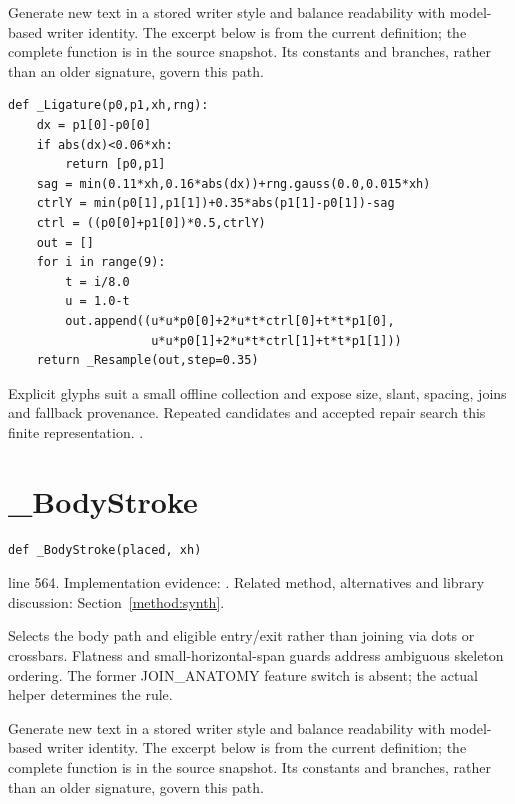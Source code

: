Generate new text in a stored writer style and balance readability with model-based writer identity. The excerpt below is from the current definition; the complete function is in the source snapshot. Its constants and branches, rather than an older signature, govern this path.


\begin{lstlisting}[style=plain]
def _Ligature(p0,p1,xh,rng):
    dx = p1[0]-p0[0]
    if abs(dx)<0.06*xh:
        return [p0,p1]
    sag = min(0.11*xh,0.16*abs(dx))+rng.gauss(0.0,0.015*xh)
    ctrlY = min(p0[1],p1[1])+0.35*abs(p1[1]-p0[1])-sag
    ctrl = ((p0[0]+p1[0])*0.5,ctrlY)
    out = []
    for i in range(9):
        t = i/8.0
        u = 1.0-t
        out.append((u*u*p0[0]+2*u*t*ctrl[0]+t*t*p1[0],
                    u*u*p0[1]+2*u*t*ctrl[1]+t*t*p1[1]))
    return _Resample(out,step=0.35)
\end{lstlisting}
Explicit glyphs suit a small offline collection and expose size, slant, spacing, joins and fallback provenance. Repeated candidates and accepted repair search this finite representation. \cite{haines2016,gravesgenerate,ganwriting,onedm}.


\section{\_BodyStroke}\label{fn:synthesise:-BodyStroke}
\begin{lstlisting}[style=sig]
def _BodyStroke(placed, xh)
\end{lstlisting}
 line 564. Implementation evidence: \cite{code2026}. Related method, alternatives and library discussion: Section~\ref{method:synth}.


Selects the body path and eligible entry/exit rather than joining via dots or crossbars. Flatness and small-horizontal-span guards address ambiguous skeleton ordering. The former JOIN\_ANATOMY feature switch is absent; the actual helper determines the rule.


Generate new text in a stored writer style and balance readability with model-based writer identity. The excerpt below is from the current definition; the complete function is in the source snapshot. Its constants and branches, rather than an older signature, govern this path.


